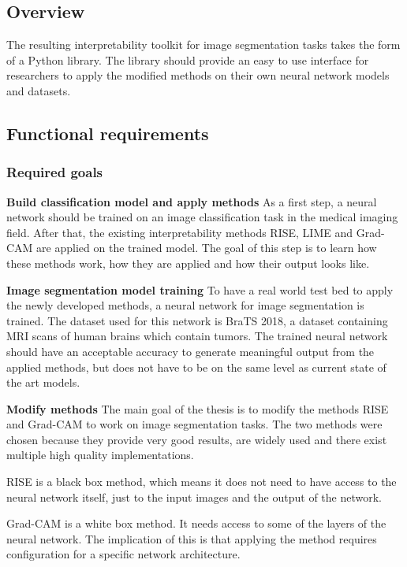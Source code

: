 \subsection{Overview}
The resulting interpretability toolkit for image segmentation tasks takes the form of a Python library. The library should provide an easy to use interface for researchers to apply
the modified methods on their own neural network models and datasets.

\subsection{Functional requirements}
\subsubsection{Required goals}

\textbf{Build classification model and apply methods}
As a first step, a neural network should be trained on an image classification task in the medical imaging field.
After that, the existing interpretability methods RISE, LIME and Grad-CAM are applied on the trained model.
The goal of this step is to learn how these methods work, how they are applied and how their output looks like.

\textbf{Image segmentation model training}
To have a real world test bed to apply the newly developed methods, a neural network for image segmentation is trained.
The dataset used for this network is BraTS 2018, a dataset containing MRI scans of human brains which contain tumors.
The trained neural network should have an acceptable accuracy to generate meaningful output from the applied methods, but
does not have to be on the same level as current state of the art models. 

\textbf{Modify methods}
The main goal of the thesis is to modify the methods RISE and Grad-CAM to work on image segmentation tasks.
The two methods were chosen because they provide very good results, are widely used and there exist multiple high
quality implementations.

RISE is a black box method, which means it does not need to have access to the neural network itself,
just to the input images and the output of the network.

Grad-CAM is a white box method. It needs access to some of the layers of the neural network. The implication of this
is that applying the method requires configuration for a specific network architecture.

